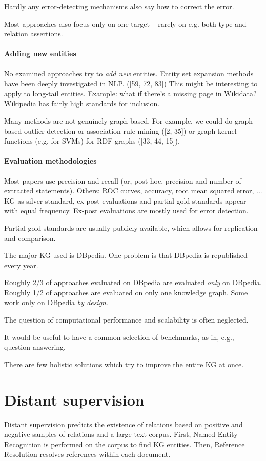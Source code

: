 Hardly any error-detecting mechanisms also say how to correct the error.

Most approaches also focus only on one target -- rarely on e.g. both type and
relation assertions.

\paragraph{Adding new entities}
No examined approaches try to \textit{add new} entities. Entity set expansion
methods have been deeply investigated in NLP. ([59, 72, 83])
This might be interesting to apply to long-tail entities.
Example: what if there's a missing page in Wikidata? Wikipedia has fairly high
standards for inclusion.

Many methods are not genuinely graph-based. For example, we could do graph-based
outlier detection or association rule mining ([2, 35]) or graph kernel functions
(e.g. for SVMs) for RDF graphs ([33, 44, 15]).

\paragraph{Evaluation methodologies}

Most papers use precision and recall (or, post-hoc, precision and number of
extracted statements). Others: ROC curves, accuracy, root mean squared error,
...
KG as silver standard, ex-post evaluations and partial gold standards appear
with equal frequency. Ex-post evaluations are mostly used for error detection.

Partial gold standards are usually publicly available, which allows for
replication and comparison.

The major KG used is DBpedia. One problem is that DBpedia is republished every
year.

Roughly 2/3 of approaches evaluated on DBpedia are evaluated \textit{only} on
DBpedia. Roughly 1/2 of approaches are evaluated on only one knowledge graph.
Some work only on DBpedia \textit{by design}.

The question of computational performance and scalability is often neglected.

It would be useful to have a common selection of benchmarks, as in, e.g.,
question answering.

There are few holistic solutions which try to improve the entire KG at once.

\section{Distant supervision}
\label{distant-supervision}
Distant supervision\cite{distant-supervision} predicts the existence of
relations based on positive and negative samples of relations and a large text
corpus. First, Named Entity Recognition is performed on the corpus to find KG
entities.
Then, Reference Resolution resolves references within each document.

